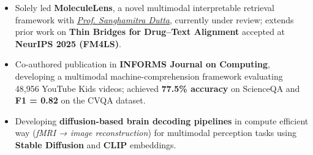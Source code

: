 \begin{experiences}
{\begin{itemize}
                        \item Solely led \textbf{MoleculeLens}, a novel multimodal interpretable retrieval framework with \textit{\href{https://sites.google.com/site/sanghamitraweb/}{\textcolor{basecolor}{Prof. Sanghamitra Dutta}}}, currently under review; extends prior work on \textbf{Thin Bridges for Drug--Text Alignment} accepted at \textbf{NeurIPS 2025 (FM4LS)}.
                        \item Co-authored publication in \textbf{INFORMS Journal on Computing}, developing a multimodal machine-comprehension framework evaluating 48{,}956 YouTube Kids videos; achieved \textbf{77.5\% accuracy} on ScienceQA and \textbf{F1 = 0.82} on the CVQA dataset.
                        \item Developing \textbf{diffusion-based brain decoding pipelines} in compute efficient way (\textit{fMRI → image reconstruction}) for multimodal perception tasks using \textbf{Stable Diffusion} and \textbf{CLIP} embeddings.
                      \end{itemize}
                    }{}


\end{experiences}
